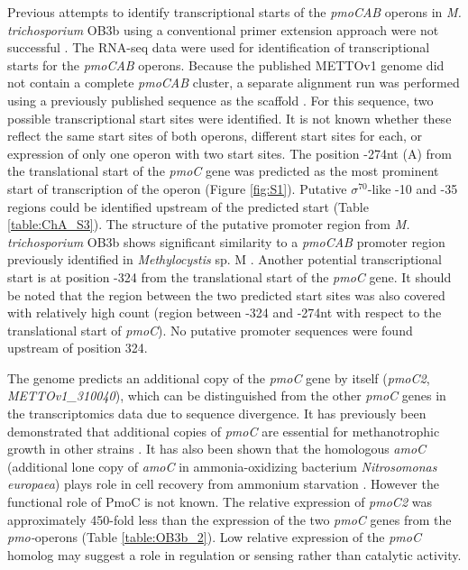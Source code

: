 Previous attempts to identify transcriptional starts of the \textit{pmoCAB} operons in \textit{M. trichosporium} OB3b using a conventional primer extension approach were not successful \cite{gilbert2000}.
The RNA-seq data were used for identification of transcriptional starts for the \textit{pmoCAB} operons.
Because the published METTOv1 genome did not contain a complete \textit{pmoCAB} cluster, a separate alignment run was performed using a previously published sequence as the scaffold \cite{holmes1995}.
For this sequence, two possible transcriptional start sites were identified.
It is not known whether these reflect the same start sites of both operons, different start sites for each, or expression of only one operon with two start sites.
The position -274nt (A) from the translational start of the \textit{pmoC} gene was predicted as the most prominent start of transcription of the operon (Figure \ref{fig:S1}).
Putative $\sigma^{70}$-like -10 and -35 regions could be identified upstream of the predicted start (Table \ref{table:ChA_S3}).
The structure of the putative promoter region from \textit{M. trichosporium} OB3b shows significant similarity to a \textit{pmoCAB} promoter region previously identified in \textit{Methylocystis} sp. M \cite{gilbert2000}.
Another potential transcriptional start is at position -324 from the translational start of the \textit{pmoC} gene.
It should be noted that the region between the two predicted start sites was also covered with relatively high count (region between -324 and -274nt with respect to the translational start of \textit{pmoC}).
No putative promoter sequences were found upstream of position 324.

The genome predicts an additional copy of the \textit{pmoC} gene by itself (\textit{pmoC2}, \textit{METTOv1\_310040}), which can be distinguished from the other \textit{pmoC} genes in the transcriptomics data due to sequence divergence.
It has previously been demonstrated that additional copies of \textit{pmoC} are essential for methanotrophic growth in other strains \cite{stolyar1999, dam2012a}.
It has also been shown that the homologous \textit{amoC} (additional lone copy of \textit{amoC} in ammonia-oxidizing bacterium \textit{Nitrosomonas europaea}) plays role in cell recovery from ammonium starvation \cite{berube2012}.
However the functional role of PmoC is not known.
The relative expression of \textit{pmoC2} was approximately 450-fold less than the expression of the two \textit{pmoC} genes from the \textit{pmo-}operons (Table \ref{table:OB3b_2}).
Low relative expression of the \textit{pmoC} homolog may suggest a role in regulation or sensing rather than catalytic activity.

